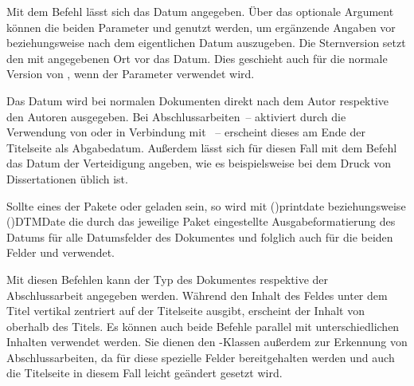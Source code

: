 \begin{DeclareEntity*}{}
\begin{DeclareEntity*}{}
\begin{DeclareEntity*}{}
\begin{Declaration}
\begin{Declaration}
\begin{Declaration}
\begin{Declaration}
\begin{Declaration}
\begin{Declaration}
Mit dem Befehl  lässt sich das Datum angegeben. 
%
Über das optionale Argument können die beiden Parameter 
 und  genutzt werden, um 
ergänzende Angaben vor beziehungsweise nach dem eigentlichen Datum auszugeben. 
Die Sternversion  setzt den mit  angegebenen Ort vor 
das Datum. Dies geschieht auch für die normale Version von , wenn 
der Parameter  verwendet wird.

Das Datum wird bei normalen Dokumenten direkt nach dem Autor respektive den 
Autoren ausgegeben. Bei Abschlussarbeiten~-- aktiviert durch die Verwendung von 
 oder  in Verbindung mit ~-- 
erscheint dieses am Ende der Titelseite als Abgabedatum. Außerdem lässt sich 
für diesen Fall mit dem Befehl  das Datum der Verteidigung 
angeben, wie es beispielsweise bei dem Druck von Dissertationen üblich ist.

Sollte eines der Pakete  oder  geladen 
sein, so wird mit \Macro(){printdate} beziehungsweise 
\Macro(){DTMDate} die durch das jeweilige Paket 
eingestellte Ausgabeformatierung des Datums für alle Datumsfelder des 
Dokumentes und folglich auch für die beiden Felder  und 
 verwendet.
\end{Declaration}
\end{Declaration}
\end{Declaration}
\end{Declaration}
\end{Declaration}
\end{Declaration}

\begin{Declaration}
  {}
\begin{Declaration}
  {}

Mit diesen Befehlen kann der Typ des Dokumentes respektive der Abschlussarbeit 
angegeben werden. Während  den Inhalt des Feldes unter dem Titel 
vertikal zentriert auf der Titelseite ausgibt, erscheint der Inhalt von 
 oberhalb des Titels. Es können auch beide Befehle parallel mit 
unterschiedlichen Inhalten verwendet werden. Sie dienen den \TUDScript-Klassen 
außerdem zur Erkennung von Abschlussarbeiten, da für diese spezielle Felder 
bereitgehalten werden und auch die Titelseite in diesem Fall leicht geändert 
gesetzt wird.


\end{Declaration}
\end{Declaration}
\end{DeclareEntity*}
\end{DeclareEntity*}
\end{DeclareEntity*}
